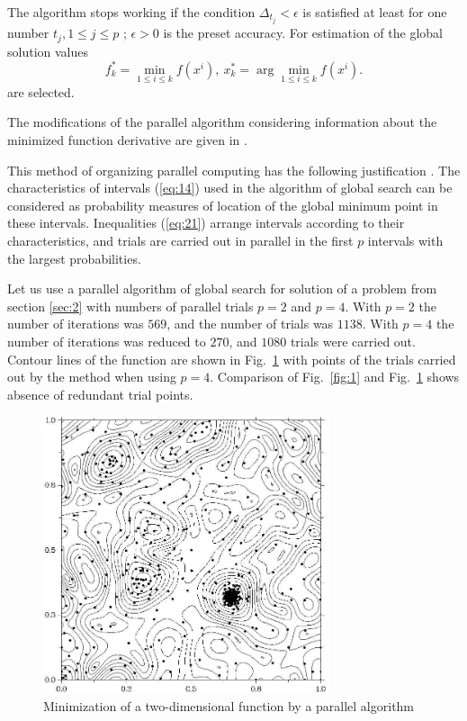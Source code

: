 \documentclass[smallcondensed]{svjour3}     %
\begin{document}
The algorithm stops working if the condition $\Delta_{t_j}<\epsilon$ is satisfied at least for one number $t_j, 1 \leq j \leq p$ ; $\epsilon>0$ is the preset accuracy.  For estimation of the global solution values
\[
f_k^\ast=\min_{1\leq i \leq k}f(x^i), \ x_k^\ast=\arg \min_{1\leq i \leq k}f(x^i).
\]
are selected.

The modifications of the parallel algorithm considering information about the minimized function derivative are given in \cite{RefGergel1999}.

This method of organizing parallel computing has the following justification \cite{RefStrongin2000,RefGrishagin1997}. The characteristics of intervals (\ref{eq:14}) used in the algorithm of global search can be considered as probability measures of location of the global minimum point in these intervals. Inequalities (\ref{eq:21}) arrange intervals according to their characteristics, and trials are carried out in parallel in the first $p$ intervals with the largest probabilities.

Let us use a parallel algorithm of global search for solution of a problem from section \ref{sec:2} with numbers of parallel trials $p=2$ and $p=4$. With $p=2$ the number of iterations was $569$, and the number of trials was $1138$. With $p=4$ the number of iterations was reduced to $270$, and $1080$ trials were carried out. Contour lines of the function are shown in Fig.~\ref{fig:2} with points of the trials carried out by the method when using $p=4$. Comparison of Fig.~\ref{fig:1} and Fig.~\ref{fig:2} shows absence of redundant trial points.
\begin{figure}
	\center
  \includegraphics[width=0.75\textwidth]{fig2.jpg} 
  \caption{Minimization of a two-dimensional function by a parallel algorithm}
  \label{fig:2}
\end{figure}
\end{document}
